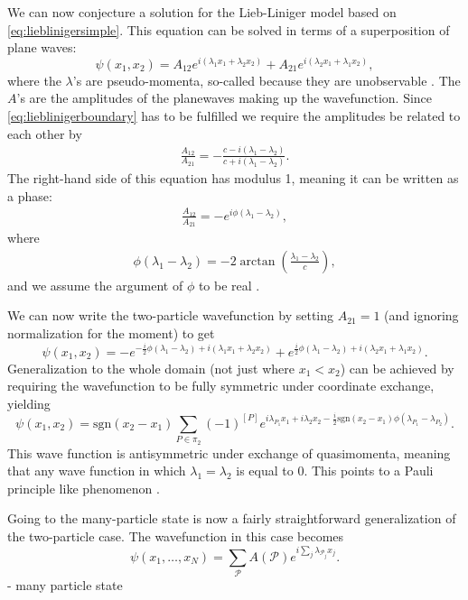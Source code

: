 \documentclass[11pt, a4paper,draft]{report} %
\begin{document}
We can now conjecture a solution for the Lieb-Liniger model based on \cref{eq:lieblinigersimple}.
This equation can be solved in terms of a superposition of plane waves:
\begin{equation}
	\psi(x_1,x_2) = A_{12} e^{i(\lambda_1x_1 + \lambda_2 x_2)} + A_{21} e^{i(\lambda_2 x_1 + \lambda_1 x_2)},
\end{equation}
where the \(\lambda\)'s are pseudo-momenta, so-called because they are unobservable \cite{Franchini2017}.
The \(A\)'s are the amplitudes of the planewaves making up the wavefunction.
Since \cref{eq:lieblinigerboundary} has to be fulfilled we require the amplitudes be related to each other by
\begin{align}
	\frac{A_{12}}{A_{21}} = -\frac{c-i(\lambda_1 - \lambda_2) }{c+i(\lambda_1 - \lambda_2)}.
\end{align}
The right-hand side of this equation has modulus 1, meaning it can be written as a phase:
\begin{align}
	\frac{A_{12}}{A_{21}} = -e^{i\phi(\lambda_1-\lambda_2)},
\end{align}
where
\begin{align}
	\phi(\lambda_1-\lambda_2) = -2\arctan\left(\frac{\lambda_1-\lambda_2}{c}\right),
\end{align}
and we assume the argument of \(\phi\) to be real \cite{Lieb1963}.

We can now write the two-particle wavefunction by setting \(A_{21}=1\) (and ignoring normalization for the moment) to get
\begin{equation}
	\psi(x_1,x_2) = - e^{-\frac{i}{2}\phi(\lambda_1-\lambda_2)+i(\lambda_1x_1 + \lambda_2 x_2)} + e^{\frac{i}{2}\phi(\lambda_1-\lambda_2)+i(\lambda_2 x_1 + \lambda_1 x_2)}.
\end{equation}
Generalization to the whole domain (not just where \(x_1 < x_2\)) can be achieved by requiring the wavefunction to be fully symmetric under coordinate exchange,
yielding
\begin{equation}
  \psi(x_1,x_2) = \textrm{sgn}(x_2-x_1)\sum_{P\in\pi_2} (-1)^{[P]} e^{i\lambda_{P_1}x_1 + i \lambda_2 x_2- \frac{i}{2} \textrm{sgn}(x_2-x_1)\phi(\lambda_{P_1}-\lambda_{P_2})}.
\end{equation}
This wave function is antisymmetric under exchange of quasimomenta, meaning that any wave function in which \(\lambda_1=\lambda_2\) is equal to 0.
This points to a Pauli principle like phenomenon \cite{findreference}.


Going to the many-particle state is now a fairly straightforward generalization of the two-particle case.
The wavefunction in this case becomes \cite{Franchini2017}
\begin{equation}
	\psi(x_1,\ldots,x_N) = \sum_{\mathcal{P}} A(\mathcal{P}) e^{i\sum_j \lambda_{\mathcal{P}_j} x_j}.
\end{equation}
- many particle state\\
\end{document}
